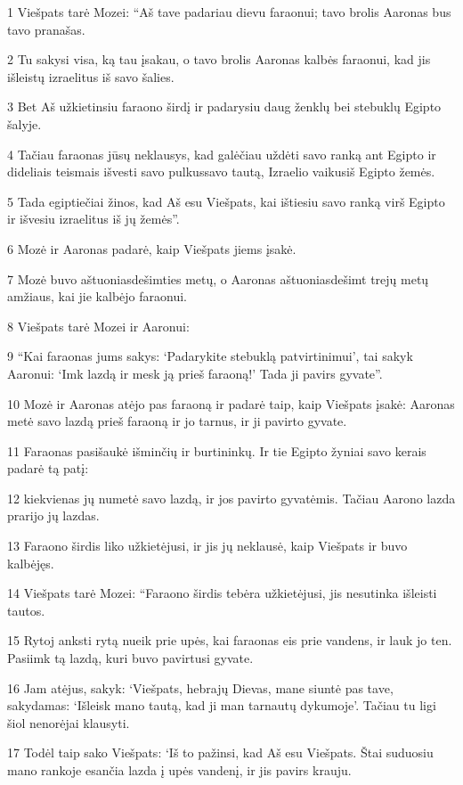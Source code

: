 \par 1 Viešpats tarė Mozei: “Aš tave padariau dievu faraonui; tavo brolis Aaronas bus tavo pranašas. 
\par 2 Tu sakysi visa, ką tau įsakau, o tavo brolis Aaronas kalbės faraonui, kad jis išleistų izraelitus iš savo šalies. 
\par 3 Bet Aš užkietinsiu faraono širdį ir padarysiu daug ženklų bei stebuklų Egipto šalyje. 
\par 4 Tačiau faraonas jūsų neklausys, kad galėčiau uždėti savo ranką ant Egipto ir dideliais teismais išvesti savo pulkus­savo tautą, Izraelio vaikus­iš Egipto žemės. 
\par 5 Tada egiptiečiai žinos, kad Aš esu Viešpats, kai ištiesiu savo ranką virš Egipto ir išvesiu izraelitus iš jų žemės”. 
\par 6 Mozė ir Aaronas padarė, kaip Viešpats jiems įsakė. 
\par 7 Mozė buvo aštuoniasdešimties metų, o Aaronas aštuoniasdešimt trejų metų amžiaus, kai jie kalbėjo faraonui. 
\par 8 Viešpats tarė Mozei ir Aaronui: 
\par 9 “Kai faraonas jums sakys: ‘Padarykite stebuklą patvirtinimui’, tai sakyk Aaronui: ‘Imk lazdą ir mesk ją prieš faraoną!’ Tada ji pavirs gyvate”. 
\par 10 Mozė ir Aaronas atėjo pas faraoną ir padarė taip, kaip Viešpats įsakė: Aaronas metė savo lazdą prieš faraoną ir jo tarnus, ir ji pavirto gyvate. 
\par 11 Faraonas pasišaukė išminčių ir burtininkų. Ir tie Egipto žyniai savo kerais padarė tą patį: 
\par 12 kiekvienas jų numetė savo lazdą, ir jos pavirto gyvatėmis. Tačiau Aarono lazda prarijo jų lazdas. 
\par 13 Faraono širdis liko užkietėjusi, ir jis jų neklausė, kaip Viešpats ir buvo kalbėjęs. 
\par 14 Viešpats tarė Mozei: “Faraono širdis tebėra užkietėjusi, jis nesutinka išleisti tautos. 
\par 15 Rytoj anksti rytą nueik prie upės, kai faraonas eis prie vandens, ir lauk jo ten. Pasiimk tą lazdą, kuri buvo pavirtusi gyvate. 
\par 16 Jam atėjus, sakyk: ‘Viešpats, hebrajų Dievas, mane siuntė pas tave, sakydamas: ‘Išleisk mano tautą, kad ji man tarnautų dykumoje’. Tačiau tu ligi šiol nenorėjai klausyti. 
\par 17 Todėl taip sako Viešpats: ‘Iš to pažinsi, kad Aš esu Viešpats. Štai suduosiu mano rankoje esančia lazda į upės vandenį, ir jis pavirs krauju. 
